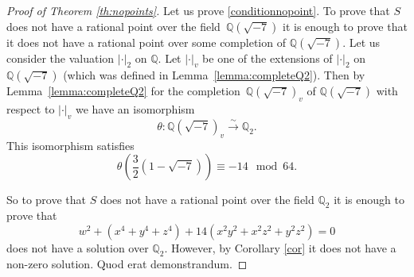 \documentclass{amsart}
\numberwithin{equation}{section}
\theoremstyle{definition}
\begin{document}
\begin{proof}[Proof of Theorem \ref{th:nopoints}]
Let us prove \ref{conditionnopoint}. To prove that $S$ does not have a rational point over the field~$\mathbb{Q}(\sqrt{-7})$ it is enough to prove that  it does not have a rational point over some completion of $\mathbb{Q}(\sqrt{-7}).$ Let us consider the valuation $|\cdot|_2$ on $\mathbb{Q}.$  Let $|\cdot|_v$ be one of the extensions of $|\cdot|_2$ on $\mathbb{Q}(\sqrt{-7})$ (which was defined in Lemma~\ref{lemma:completeQ2}). Then by Lemma~\ref{lemma:completeQ2} for the completion~$\mathbb{Q}(\sqrt{-7})_v$ of $\mathbb{Q}(\sqrt{-7})$ with respect to $|\cdot|_v$ we have an isomorphism
$$
\theta:\mathbb{Q}(\sqrt{-7})_v  \xrightarrow{\sim} \mathbb{Q}_2.
$$ 
This isomorphism satisfies
$$
\theta\left(\frac{3}{2}(1-\sqrt{-7})\right) \equiv -14 \mod 64.
$$ 

\noindent So to prove that  $S$ does not have a rational point over the field $\mathbb{Q}_2$ it is enough to prove that
$$
w^2+(x^4+y^4+z^4)+14(x^2y^2+x^2z^2+y^2z^2)=0
$$
\noindent does not have a solution over $\mathbb{Q}_2.$   However, by Corollary \ref{cor} it does not have a non-zero solution. Quod erat demonstrandum.


\end{proof}


















































%
%
%
%
%
\end{document}
